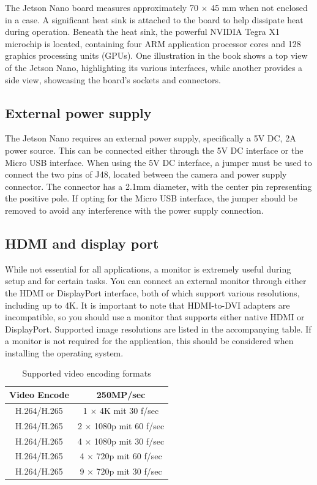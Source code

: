 The Jetson Nano board measures approximately 70 × 45 mm when not enclosed in a case. A significant heat sink is attached to the board to help dissipate heat during operation. Beneath the heat sink, the powerful NVIDIA Tegra X1 microchip is located, containing four ARM application processor cores and 128 graphics processing units (GPUs). One illustration in the book shows a top view of the Jetson Nano, highlighting its various interfaces, while another provides a side view, showcasing the board's sockets and connectors. \cite{NVI:2019}



\subsection{External power supply}

The Jetson Nano requires an external power supply, specifically a 5V DC, 2A power source. This can be connected either through the 5V DC interface or the Micro USB interface. When using the 5V DC interface, a jumper must be used to connect the two pins of J48, located between the camera and power supply connector. The connector has a 2.1mm diameter, with the center pin representing the positive pole. If opting for the Micro USB interface, the jumper should be removed to avoid any interference with the power supply connection. \cite{NVI:2021}


\subsection{HDMI and display port}

While not essential for all applications, a monitor is extremely useful during setup and for certain tasks. You can connect an external monitor through either the HDMI or DisplayPort interface, both of which support various resolutions, including up to 4K. It is important to note that HDMI-to-DVI adapters are incompatible, so you should use a monitor that supports either native HDMI or DisplayPort. Supported image resolutions are listed in the accompanying table. If a monitor is not required for the application, this should be considered when installing the operating system. \cite{NVI:2019}


\begin{table}
	\centering
	\begin{tabular}{cc}
		\textbf{Video Encode}  & \textbf{250MP/sec} \\   \hline
		H.264/H.265           & 1 $\times$  4K mit  30 f/sec \\
		H.264/H.265	       & 2 $\times$ 1080p mit 60 f/sec \\
		H.264/H.265	       & 4 $\times$ 1080p mit 30 f/sec \\
		H.264/H.265	       & 4 $\times$ 720p mit 60 f/sec  \\
		H.264/H.265	       & 9 $\times$ 720p mit 30 f/sec \\
	\end{tabular}
	\caption{Supported video encoding formats}\label{Jetson:Aufloesungen}
\end{table}

